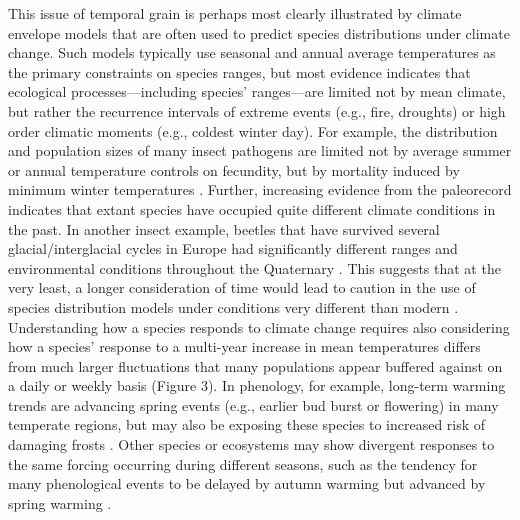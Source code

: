 \documentclass[11pt,a4paper,oneside]{article}
\begin{document}
This issue of temporal grain is perhaps most clearly illustrated by climate envelope models that are often used to predict species distributions under climate change. Such models typically use seasonal and annual average temperatures as the primary constraints on species ranges, but most evidence indicates that ecological processes---including species' ranges---are limited not by mean climate, but rather the recurrence intervals of extreme events (e.g., fire, droughts) or high order climatic moments (e.g., coldest winter day). For example, the distribution and population sizes of many insect pathogens are limited not by average summer or annual temperature controls on fecundity, but by mortality induced by minimum winter temperatures \citep{weed2013}. Further, increasing evidence from the paleorecord indicates that extant species have occupied quite different climate conditions in the past. In another insect example, beetles that have survived several glacial/interglacial cycles in Europe had significantly different ranges and environmental conditions throughout the Quaternary \citep{Abellan2011}. This suggests that at the very least, a longer consideration of time would lead to caution in the use of species distribution models under conditions very different than modern \citep[e.g.,][]{Williams:2007kx}. Understanding how a species responds to climate change requires also considering how a species' response to a multi-year increase in mean temperatures differs from much larger fluctuations that many populations appear buffered against on a daily or weekly basis (Figure 3). In phenology, for example, long-term warming trends are advancing spring events (e.g., earlier bud burst or flowering) in many temperate regions, but may also be exposing these species to increased risk of damaging frosts \citep[e.g.,][]{Augspurger:2009gj}. Other species or ecosystems may show divergent responses to the same forcing occurring during different seasons, such as the tendency for many phenological events to be delayed by autumn warming but advanced by spring warming \citep{Cook:2012pnas}. 
\end{document}
